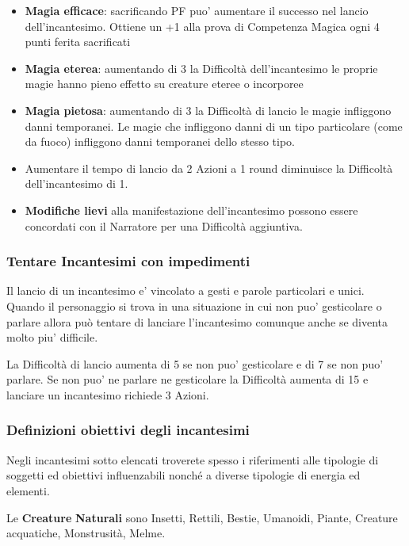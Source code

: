 \begin{multicols}{2}
\begin{itemize}
	\item
	\textbf{Magia efficace}: sacrificando PF puo' aumentare il successo nel lancio dell'incantesimo. Ottiene un +1 alla prova di Competenza Magica ogni 4 punti ferita sacrificati
	\item
	\textbf{Magia eterea}: aumentando di 3 la Difficoltà dell'incantesimo le proprie magie hanno pieno effetto su creature eteree o incorporee
	\item
	\textbf{Magia pietosa}: aumentando di 3 la Difficoltà di lancio le magie infliggono danni temporanei. 
	Le magie che infliggono danni di un tipo particolare (come da fuoco) infliggono danni temporanei dello stesso tipo.
	\item
	Aumentare il tempo di lancio da 2 Azioni a 1 round diminuisce la Difficoltà dell'incantesimo di 1.
	\item
	\textbf{Modifiche lievi} alla manifestazione dell'incantesimo possono essere concordati con il Narratore per una Difficoltà aggiuntiva. 
\end{itemize}

\subsubsection{Tentare Incantesimi con impedimenti} 

Il lancio di un incantesimo e' vincolato a gesti e parole particolari e unici. Quando il personaggio si trova in una situazione in cui non puo' gesticolare o parlare allora può tentare di lanciare l'incantesimo comunque anche se diventa molto piu' difficile.

La Difficoltà di lancio aumenta di 5 se non puo' gesticolare e di 7 se non puo' parlare. Se non puo' ne parlare ne gesticolare la Difficoltà aumenta di 15 e lanciare un incantesimo richiede 3 Azioni.

\subsubsection{Definizioni obiettivi degli incantesimi}

Negli incantesimi sotto elencati troverete spesso i riferimenti alle tipologie di soggetti ed obiettivi influenzabili nonché a diverse tipologie di energia ed elementi. 

\item Le \textbf{Creature} \textbf{Naturali} sono Insetti, Rettili, Bestie, Umanoidi, Piante, Creature acquatiche, Monstrusità, Melme.


\end{multicols}
